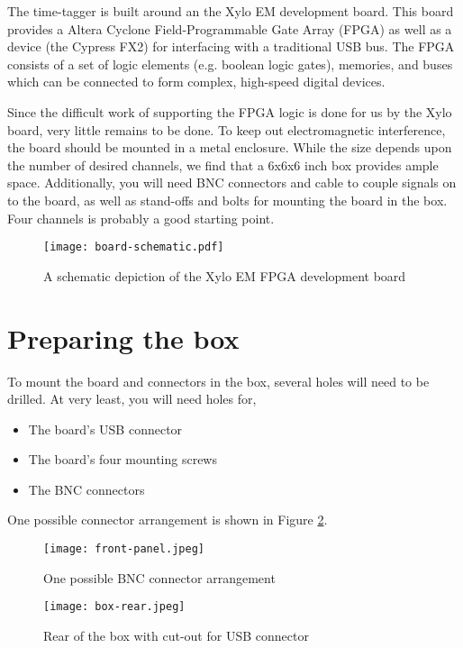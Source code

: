 The time-tagger is built around an the Xylo EM development board. This
board provides a Altera Cyclone Field-Programmable Gate Array (FPGA)
as well as a device (the Cypress FX2) for interfacing with a
traditional USB bus. The FPGA consists of a set of logic elements
(e.g. boolean logic gates), memories, and buses which can be connected
to form complex, high-speed digital devices.

Since the difficult work of supporting the FPGA logic is done for us
by the Xylo board, very little remains to be done. To keep out
electromagnetic interference, the board should be mounted in a metal
enclosure. While the size depends upon the number of desired channels,
we find that a 6x6x6 inch box provides ample space. Additionally, you
will need BNC connectors and cable to couple signals on to the board,
as well as stand-offs and bolts for mounting the board in the
box. Four channels is probably a good starting point.

\begin{figure}
  \center
  \texttt{[image: board-schematic.pdf]}
  \caption{A schematic depiction of the Xylo EM FPGA development board}
  \label{fig:board-schematic}
\end{figure}

\section{Preparing the box}

To mount the board and connectors in the box, several holes will need
to be drilled. At very least, you will need holes for,

\begin{itemize}
  \item The board's USB connector
  \item The board's four mounting screws 
  \item The BNC connectors
\end{itemize}

One possible connector arrangement is shown in Figure
\ref{fig:front-panel}.

\begin{figure}
  \center
  \texttt{[image: front-panel.jpeg]}
  \caption{One possible BNC connector arrangement}
  \label{fig:front-panel}
\end{figure}

\begin{figure}
  \center
  \texttt{[image: box-rear.jpeg]}
  \caption{Rear of the box with cut-out for USB connector}
  \label{fig:box-rear}
\end{figure}

